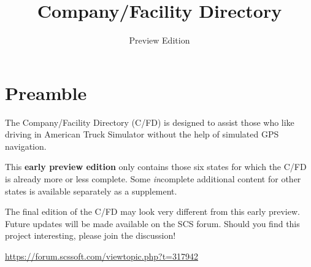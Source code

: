
\subject{City location descriptions for ATS}
\title{Company\!/Facility Directory}
\subtitle{Preview Edition}




\maketitle

\vspace{5mm}
\section*{Preamble}

{
\justifying

The Company/Facility Directory (C/FD) is designed to assist those who like driving in American Truck Simulator without the help of simulated GPS navigation.

This \textbf{early preview edition} only contains those six states for which the C/FD is already more or less complete.
Some \emph{in}complete additional content for other states is available separately as a supplement.



The final edition of the C/FD may look very different from this early preview.
Future updates will be made available on the SCS forum.
Should you find this project interesting, please join the discussion!

\centering \vspace{1ex}
\url{https://forum.scssoft.com/viewtopic.php?t=317942} \par
}

